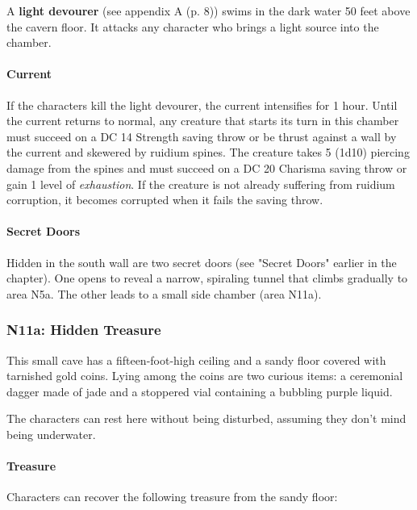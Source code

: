 \documentclass[letterpaper, 11pt, bg=full, twocolumn]{dndbook}
\begin{document}
A \textbf{light devourer} (see appendix A (p. 8)) swims in the dark water 50 feet above the cavern floor. It attacks any character who brings a light source into the chamber.

\paragraph{Current}

If the characters kill the light devourer, the current intensifies for 1 hour. Until the current returns to normal, any creature that starts its turn in this chamber must succeed on a DC 14 Strength saving throw or be thrust against a wall by the current and skewered by ruidium spines. The creature takes 5 (1d10) piercing damage from the spines and must succeed on a DC 20 Charisma saving throw or gain 1 level of \textit{exhaustion}. If the creature is not already suffering from ruidium corruption, it becomes corrupted when it fails the saving throw.

\paragraph{Secret Doors}

Hidden in the south wall are two secret doors (see "Secret Doors" earlier in the chapter). One opens to reveal a narrow, spiraling tunnel that climbs gradually to area N5a. The other leads to a small side chamber (area N11a).

\subsubsection{N11a: Hidden Treasure}

\begin{DndReadAloud}
This small cave has a fifteen-foot-high ceiling and a sandy floor covered with tarnished gold coins. Lying among the coins are two curious items: a ceremonial dagger made of jade and a stoppered vial containing a bubbling purple liquid.
\end{DndReadAloud}

The characters can rest here without being disturbed, assuming they don't mind being underwater.

\paragraph{Treasure}

Characters can recover the following treasure from the sandy floor:
\end{document}
